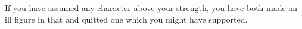 If you have  assumed any character above  your strength, you have  both made an
ill figure in that and quitted one which you might have supported.
